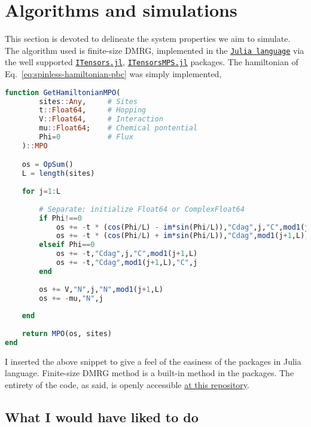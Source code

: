 \clearpage
\section{Algorithms and simulations}

This section is devoted to delineate the system properties we aim to simulate. The algorithm used is finite-size DMRG, implemented in the \href{https://docs.julialang.org/en/}{\texttt{Julia language}} via the well supported \href{https://itensor.github.io/ITensors.jl/stable/index.html}{\texttt{ITensors.jl}}, \href{https://itensor.github.io/ITensorMPS.jl/stable/}{\texttt{ITensorsMPS.jl}} packages. The hamiltonian of Eq.~\eqref{eq:spinless-hamiltonian-pbc} was simply implemented,

\begin{lstlisting}[language=julia]
function GetHamiltonianMPO(
		sites::Any,		# Sites
		t::Float64,		# Hopping
		V::Float64,		# Interaction
		mu::Float64;	# Chemical pontential
		Phi=0			# Flux
	)::MPO

	os = OpSum()
	L = length(sites)
	
	for j=1:L
		
		# Separate: initialize Float64 or ComplexFloat64 
		if Phi!==0
			os += -t * (cos(Phi/L) - im*sin(Phi/L)),"Cdag",j,"C",mod1(j+1,L)
			os += -t * (cos(Phi/L) + im*sin(Phi/L)),"Cdag",mod1(j+1,L),"C",j
		elseif Phi==0
			os += -t,"Cdag",j,"C",mod1(j+1,L)
			os += -t,"Cdag",mod1(j+1,L),"C",j
		end
		
		os += V,"N",j,"N",mod1(j+1,L)
		os += -mu,"N",j
		
	end
	
	return MPO(os, sites)
end
\end{lstlisting}
I inserted the above snippet to give a feel of the easiness of the packages in Julia language. Finite-size DMRG method is a built-in method in the packages. The entirety of the code, as said, is openly accessible \href{https://github.com/nepero27178/FermiHubbardDMRG}{at this repository}.

\subsection{What I would have liked to do}

